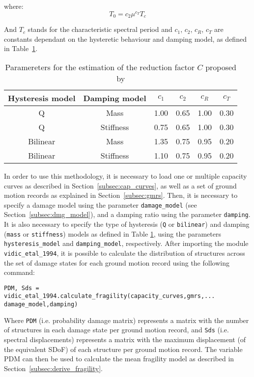 where:
\begin{equation}
T_0 = c_2\mu^{c_T}T_c
\end{equation}

And $T_c$ stands for the characteristic spectral period and $c_1$, $c_2$, $c_R$, $c_T$ are constants dependant on the hysteretic behaviour and damping model, as defined in Table~\ref{table:VidicEtAl}.

\begin {table}[htb]
\caption{Paramereters for the estimation of the reduction factor $C$ proposed by \citep{VidicEtAl1994}}
\label{table:VidicEtAl}
\begin{center}
  \begin{tabular}{ | c | c | c | c | c | c |}
    \hline
    Hysteresis model & Damping model & $c_1$ & $c_2$ & $c_R$ & $c_T$ \\ \hline
    Q & Mass & 1.00 & 0.65 & 1.00 & 0.30 \\ \hline
    Q & Stiffness & 0.75 & 0.65 & 1.00 & 0.30 \\ \hline
    Bilinear & Mass & 1.35 & 0.75 & 0.95 & 0.20 \\ \hline
    Bilinear & Stiffness & 1.10 & 0.75 & 0.95 & 0.20 \\ \hline
  \end{tabular}
\end{center}
\end{table}

In order to use this methodology, it is necessary to load one or multiple capacity curves as described in Section~\ref{subsec:cap_curves}, as well as a set of ground motion records as explained in Section~\ref{subsec:gmrs}. Then, it is necessary to specify a damage model using the parameter \verb=damage_model= (see Section~\ref{subsec:dmg_model}), and a damping ratio using the parameter \verb=damping=. It is also necessary to specify the type of hysteresis (\verb=Q= or \verb=bilinear=) and damping (\verb=mass= or \verb=stiffness=) models as defined in Table \ref{table:VidicEtAl}, using the parameters \verb=hysteresis_model= and \verb=damping_model=, respectively. After importing the module \verb=vidic_etal_1994=, it is possible to calculate the distribution of structures across the set of damage states for each ground motion record using the following command:

\begin{Verbatim}[frame=single, commandchars=\\\{\}, samepage=true]
PDM, Sds = vidic_etal_1994.calculate_fragility(capacity_curves,gmrs,...
damage_model,damping)
\end{Verbatim}

Where \verb=PDM= (i.e. probability damage matrix) represents a matrix with the number of structures in each damage state per ground motion record, and \verb=Sds= (i.e. spectral displacements) represents a matrix with the maximum displacement (of the equivalent SDoF) of each structure per ground motion record. The variable PDM can then be used to calculate the mean fragility model as described in Section~\ref{subsec:derive_fragility}.